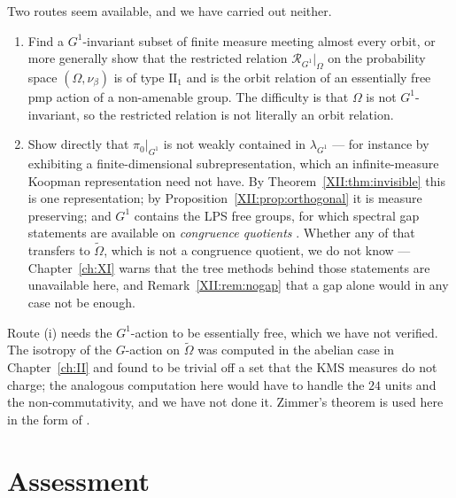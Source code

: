 \begin{remark}\label{XII:rem:suffice}
Two routes seem available, and we have carried out neither.
\begin{enumerate}
\item Find a $G^1$-invariant subset of finite measure meeting almost every orbit, or more
generally show that the restricted relation $\mathcal R_{G^1}|_\Omega$ on the probability
space $(\Omega,\nu_\beta)$ is of type $\mathrm{II}_1$ and is the orbit relation of an
essentially free pmp action of a non-amenable group. The difficulty is that $\Omega$ is not
$G^1$-invariant, so the restricted relation is not literally an orbit relation.
\item Show directly that $\pi_0|_{G^1}$ is not weakly contained in $\lambda_{G^1}$ --- for
instance by exhibiting a finite-dimensional subrepresentation, which an infinite-measure
Koopman representation need not have. By Theorem~\ref{XII:thm:invisible} this is one
representation; by Proposition~\ref{XII:prop:orthogonal} it is measure preserving; and $G^1$
contains the LPS free groups, for which spectral gap statements are available on
\emph{congruence quotients} \cite{LPS}. Whether any of that transfers to $\widetilde\Omega$,
which is not a congruence quotient, we do not know --- Chapter~\ref{ch:XI} warns that the tree methods
behind those statements are unavailable here, and Remark~\ref{XII:rem:nogap} that a gap alone
would in any case not be enough.
\end{enumerate}
\end{remark}

\begin{remark}\label{XII:rem:free}
Route (i) needs the $G^1$-action to be essentially free, which we have not verified. The
isotropy of the $G$-action on $\widetilde\Omega$ was computed in the abelian case in Chapter~\ref{ch:II}
and found to be trivial off a set that the $\mathrm{KMS}$ measures do not charge; the
analogous computation here would have to handle the $24$ units and the non-commutativity,
and we have not done it. Zimmer's theorem is used here in the form of \cite[Ch.~4]{Zimmer}.
\end{remark}

\section{Assessment}

